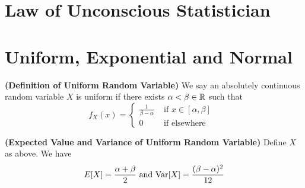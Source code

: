 \documentclass{report}
\begin{document}
\section{Law of Unconscious Statistician}
\section{Uniform, Exponential and Normal}
\begin{definition}
\label{2.1.1}
\textbf{(Definition of Uniform Random Variable)} We say an absolutely continuous random variable $X$ is uniform if there exists $\alpha <\beta \in\mathbb{R}$ such that
\begin{equation}
f_X(x)=\begin{cases}
\frac{1}{\beta -\alpha }& \text{ if $x\in [\alpha ,\beta ]$ }\\
0& \text{ if elsewhere }
\end{cases}
\end{equation}
\end{definition}
\begin{theorem}
\label{2.1.2}
\textbf{(Expected Value and Variance of Uniform Random Variable)} Define $X$ as above. We have
\begin{equation}
E[X]=\frac{\alpha +\beta }{2}\text{ and }\text{Var} [X]=\frac{(\beta -\alpha )^2}{12}
\end{equation}
\end{theorem}
\end{document}
